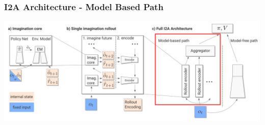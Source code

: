 
%    


\begin{frame}
    \frametitle{I2A Architecture - Model Based Path}


\includegraphics[width=\columnwidth]{./Images/i2a_all_model_based_path.png}%

    
\end{frame}
\clearpage

